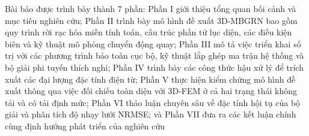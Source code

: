 Bài báo được trình bày thành 7 phần: Phần I giới thiệu tổng quan bối cảnh và mục tiêu nghiên cứu; Phần II trình bày mô hình đề xuất 3D-MBGRN bao gồm quy trình rời rạc hóa miền tính toán, cấu trúc phần tử lục diện, các điều kiện biên và kỹ thuật mô phỏng chuyển động quay; Phần III mô tả việc triển khai số trị với các phương trình bảo toàn cục bộ, kỹ thuật lắp ghép ma trận hệ thống và bộ giải phi tuyến thích nghi; Phần IV trình bày các công thức hậu xử lý để trích xuất các đại lượng đặc tính điện từ; Phần V thực hiện kiểm chứng mô hình đề xuất thông qua việc đối chiếu toàn diện với 3D-FEM ở cả hai trạng thái không tải và có tải định mức; Phần VI thảo luận chuyên sâu về đặc tính hội tụ của bộ giải và phân tích độ nhạy lưới NRMSE; và Phần VII đưa ra các kết luận chính cùng định hướng phát triển của nghiên cứu